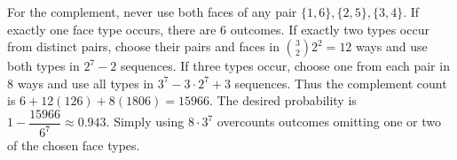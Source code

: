 For the complement, never use both faces of any pair $\{1,6\},\{2,5\},\{3,4\}$. If exactly one face type occurs, there are 6 outcomes. If exactly two types occur from distinct pairs, choose their pairs and faces in $\binom32 2^2=12$ ways and use both types in $2^7-2$ sequences. If three types occur, choose one from each pair in 8 ways and use all types in $3^7-3\cdot2^7+3$ sequences. Thus the complement count is $6+12(126)+8(1806)=15966$. The desired probability is $1-\dfrac{15966}{6^7}\approx\boxed{0.943}$. Simply using $8\cdot3^7$ overcounts outcomes omitting one or two of the chosen face types.

